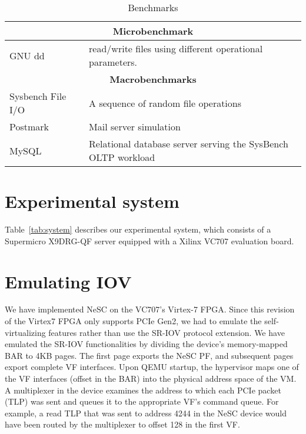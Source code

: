 \begin{table}[ht]
  \small
  \begin{tabular}{|p{}|p{}|}
    \hline
    \multicolumn{2}{|c|}{\textbf{Microbenchmark}} \\
    \hline
    GNU dd~\cite{coreutils}	& read/write files using different operational parameters.\\
    \hline
    \hline
    \multicolumn{2}{|c|}{\textbf{Macrobenchmarks}} \\
    \hline
    Sysbench File I/O~\cite{kopytov2004sysbench}
    			& A sequence of random file operations \\
    \hline
    Postmark~\cite{katcher1997postmark}
    			& Mail server simulation \\
    \hline
    MySQL~\cite{mysql}	& Relational database server serving the SysBench OLTP workload  \\
    \hline
    \hline
  \end{tabular}

  \vspace*{-2ex}
  \caption{Benchmarks\label{tab:bench}}


\end{table}


\section*{Experimental system}
Table~\ref{tab:system} describes our experimental system, which consists of a Supermicro X9DRG-QF server equipped with a Xilinx VC707 evaluation board.

\section*{Emulating IOV}
We have implemented NeSC on the VC707's Virtex-7 FPGA. Since this revision of the Virtex7 FPGA only supports PCIe Gen2, we had to emulate the self-virtualizing features rather than use the SR-IOV protocol extension. We have emulated the SR-IOV functionalities by dividing the device's memory-mapped BAR to 4KB pages. The first page exports the NeSC PF, and subsequent pages export complete VF interfaces. Upon QEMU startup, the hypervisor maps one of the VF interfaces (offset in the BAR) into the physical address space of the VM. A  multiplexer in the device examines the address to which each PCIe packet (TLP) was sent and queues it to the appropriate VF's command queue. For example, a read TLP that was sent to address 4244 in the NeSC device would have been routed by the multiplexer to offset 128 in the first VF.

